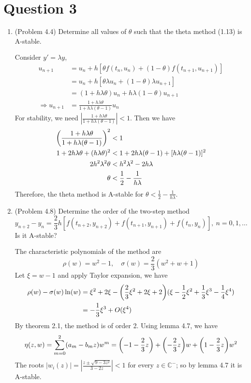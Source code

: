 \documentclass[10pt]{report}
\newcommand{\ds}{\displaystyle}
\newcommand{\abs}[1] {\left| #1 \right|}
\DeclarePairedDelimiter\autoparen{(}{)}
\newcommand{\pa}[1]{\autoparen*{#1}}
\begin{document}
\section*{Question 3}
\begin{enumerate}
	\item 
	(Problem 4.4) Determine all values of $\theta$ such that the theta method (1.13) is A-stable.
	
	Consider $y'=\lambda y$,
	\begin{align*}
		u_{n+1} &= u_n + h[\theta f(t_n, u_n) + (1-\theta)f(t_{n+1}, u_{n+1})]\\
		&= u_n + h[\theta\lambda u_n + (1-\theta)\lambda u_{n+1}]\\
		&= (1+h\lambda\theta) u_n + h\lambda(1-\theta) u_{n+1}\\
		\Rightarrow
		u_{n+1} &= \frac{1+h\lambda\theta}{1+h\lambda(\theta-1)} u_n
	\end{align*}
	For stability, we need $\abs{\frac{1+h\lambda\theta}{1+h\lambda(\theta-1)}}<1$. Then we have
	\begin{align*}
		\pa{\frac{1+h\lambda\theta}{1+h\lambda(\theta-1)}}^2 &< 1\\
		1+2h\lambda\theta + (h\lambda\theta)^2 &< 1+2h\lambda(\theta-1) + [h\lambda(\theta-1)]^2\\
		2h^2\lambda^2\theta &< h^2\lambda^2 - 2h\lambda\\
		\theta &< \frac{1}{2} - \frac{1}{h\lambda}
	\end{align*}
	Therefore, the theta method is A-stable for $\theta < \frac{1}{2} - \frac{1}{h\lambda}$.
	
	\item 
	(Problem 4.8) Determine the order of the two-step method
	\[
	y_{n+2} - y_n = \frac{2}{3}h[f(t_{n+2},y_{n+2}) + f(t_{n+1},y_{n+1}) + f(t_{n},y_{n})],\ n=0,1,\dots
	\]
	Is it A-stable?
	
	The characteristic polynomials of the method are
	\[
	\rho(w) = w^2 - 1, \quad \sigma(w) = \frac{2}{3}(w^2 + w + 1)
	\]
	Let $\xi = w-1$ and apply Taylor expansion, we have
	\begin{align*}
		\rho(w) - \sigma(w)\ln(w)
		&= \xi^2 + 2\xi - \pa{\frac{2}{3}\xi^2 + 2\xi + 2}(\xi - \frac{1}{2}\xi^2 + \frac{1}{3}\xi^3 - \frac{1}{4}\xi^4)\\
		&= -\frac{1}{3}\xi^3 + O(\xi^4)
	\end{align*}
	By theorem 2.1, the method is of order 2. Using lemma 4.7, we have
	\[
	\eta(z, w) = \sum_{m=0}^{2} (a_m - b_mz)w^m = \pa{-1-\frac{2}{3}z} + \pa{-\frac{2}{3}z}w + \pa{1-\frac{2}{3}z}w^2
	\]
	The roots $\ds \abs{w_i(z)} = \abs{\frac{z\pm \sqrt{9-3z^2}}{3-2z}} < 1$ for every $z\in \mathbb{C}^-$; so by lemma 4.7 it is A-stable.
\end{enumerate}
\end{document}
